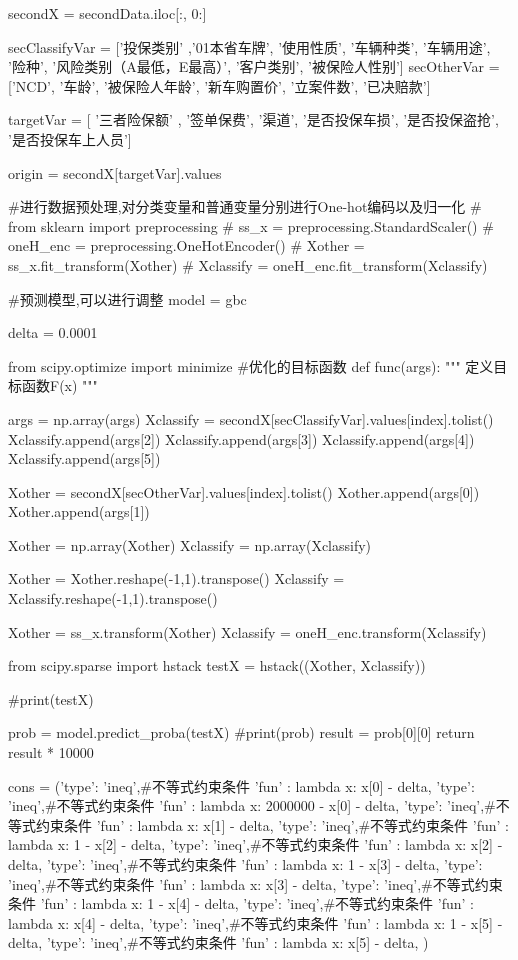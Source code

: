 \documentclass[a4paper]{article}
\begin{document}
\begin{*sec.py*}
			secondX = secondData.iloc[:, 0:]
			
			
			secClassifyVar = ['投保类别' ,'01本省车牌', '使用性质', '车辆种类', '车辆用途',
			'险种', '风险类别（A最低，E最高）', '客户类别', '被保险人性别']
			secOtherVar = ['NCD', '车龄', '被保险人年龄', '新车购置价',  '立案件数', '已决赔款']
			
			targetVar = [ '三者险保额' , '签单保费', '渠道', '是否投保车损', '是否投保盗抢', '是否投保车上人员']
			
			
			origin = secondX[targetVar].values
			
			
			#进行数据预处理,对分类变量和普通变量分别进行One-hot编码以及归一化
			# from sklearn import preprocessing
			# ss_x = preprocessing.StandardScaler()
			# oneH_enc = preprocessing.OneHotEncoder()
			# Xother = ss_x.fit_transform(Xother)
			# Xclassify = oneH_enc.fit_transform(Xclassify)
			
			
			#预测模型,可以进行调整
			model = gbc
			
			delta = 0.0001
			
			from scipy.optimize import minimize
			#优化的目标函数
			def func(args):
			""" 定义目标函数F(x) """
			
			args = np.array(args)
			Xclassify = secondX[secClassifyVar].values[index].tolist()
			Xclassify.append(args[2])
			Xclassify.append(args[3])
			Xclassify.append(args[4])
			Xclassify.append(args[5])
			
			Xother = secondX[secOtherVar].values[index].tolist()
			Xother.append(args[0])
			Xother.append(args[1])
			
			Xother = np.array(Xother)
			Xclassify = np.array(Xclassify)
			
			Xother = Xother.reshape(-1,1).transpose()
			Xclassify = Xclassify.reshape(-1,1).transpose()
			
			
			Xother = ss_x.transform(Xother)
			Xclassify = oneH_enc.transform(Xclassify)
			
			from scipy.sparse import hstack
			testX = hstack((Xother, Xclassify))
			
			#print(testX)
			
			prob = model.predict_proba(testX)
			#print(prob)
			result = prob[0][0]
			return result * 10000
			
			cons = ({'type': 'ineq',#不等式约束条件
				'fun' : lambda x: x[0] - delta},
			{'type': 'ineq',#不等式约束条件
				'fun' : lambda x: 2000000 - x[0] - delta},
			{'type': 'ineq',#不等式约束条件
				'fun' : lambda x: x[1] - delta},
			{'type': 'ineq',#不等式约束条件
				'fun' : lambda x: 1 - x[2] - delta},
			{'type': 'ineq',#不等式约束条件
				'fun' : lambda x: x[2] - delta},
			{'type': 'ineq',#不等式约束条件
				'fun' : lambda x: 1 - x[3] - delta},
			{'type': 'ineq',#不等式约束条件
				'fun' : lambda x: x[3] - delta},
			{'type': 'ineq',#不等式约束条件
				'fun' : lambda x: 1 - x[4] - delta},
			{'type': 'ineq',#不等式约束条件
				'fun' : lambda x: x[4] - delta},
			{'type': 'ineq',#不等式约束条件
				'fun' : lambda x: 1 - x[5] - delta},
			{'type': 'ineq',#不等式约束条件
				'fun' : lambda x: x[5] - delta},
			)
			

\end{*sec.py*}
\end{document}
